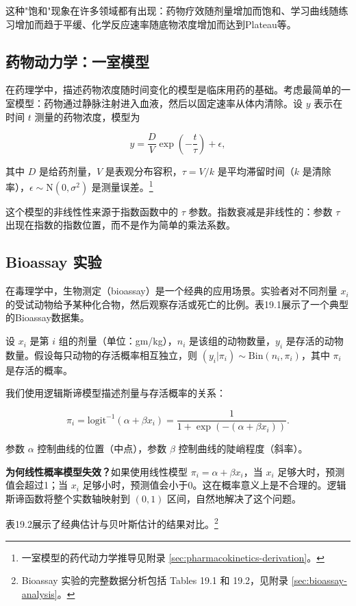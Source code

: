 这种"饱和"现象在许多领域都有出现：药物疗效随剂量增加而饱和、学习曲线随练习增加而趋于平缓、化学反应速率随底物浓度增加而达到Plateau等。

\subsection{药物动力学：一室模型}

在药理学中，描述药物浓度随时间变化的模型是临床用药的基础。考虑最简单的一室模型：药物通过静脉注射进入血液，然后以固定速率从体内清除。设 $y$ 表示在时间 $t$ 测量的药物浓度，模型为

\begin{equation}
y = \frac{D}{V} \exp\left(-\frac{t}{\tau}\right) + \epsilon, \label{eq:pharmacokinetics-one-compartment}
\end{equation}

其中 $D$ 是给药剂量，$V$ 是表观分布容积，$\tau = V/k$ 是平均滞留时间（$k$ 是清除率），$\epsilon \sim \mathrm{N}(0, \sigma^2)$ 是测量误差。\footnote{一室模型的药代动力学推导见附录 \cref{sec:pharmacokinetics-derivation}。}

这个模型的非线性性来源于指数函数中的 $\tau$ 参数。指数衰减是非线性的：参数 $\tau$ 出现在指数的指数位置，而不是作为简单的乘法系数。

\subsection{Bioassay 实验}\label{sec:bioassay}

在毒理学中，生物测定（bioassay）是一个经典的应用场景。实验者对不同剂量 $x_i$ 的受试动物给予某种化合物，然后观察存活或死亡的比例。表19.1展示了一个典型的Bioassay数据集。

\begin{Example}[Bioassay 实验]\label{ex:bioassay}
设 $x_i$ 是第 $i$ 组的剂量（单位：gm/kg），$n_i$ 是该组的动物数量，$y_i$ 是存活的动物数量。假设每只动物的存活概率相互独立，则 $(y_i | \pi_i) \sim \mathrm{Bin}(n_i, \pi_i)$，其中 $\pi_i$ 是存活的概率。

我们使用逻辑斯谛模型描述剂量与存活概率的关系：

\begin{equation}
\pi_i = \mathrm{logit}^{-1}(\alpha + \beta x_i) = \frac{1}{1 + \exp(-(\alpha + \beta x_i))}. \label{eq:bioassay-logistic}
\end{equation}

参数 $\alpha$ 控制曲线的位置（中点），参数 $\beta$ 控制曲线的陡峭程度（斜率）。

\textbf{为何线性概率模型失效？}如果使用线性模型 $\pi_i = \alpha + \beta x_i$，当 $x_i$ 足够大时，预测值会超过1；当 $x_i$ 足够小时，预测值会小于0。这在概率意义上是不合理的。逻辑斯谛函数将整个实数轴映射到 $(0,1)$ 区间，自然地解决了这个问题。

表19.2展示了经典估计与贝叶斯估计的结果对比。\footnote{Bioassay 实验的完整数据分析包括 Tables 19.1 和 19.2，见附录 \cref{sec:bioassay-analysis}。}
\end{Example}

